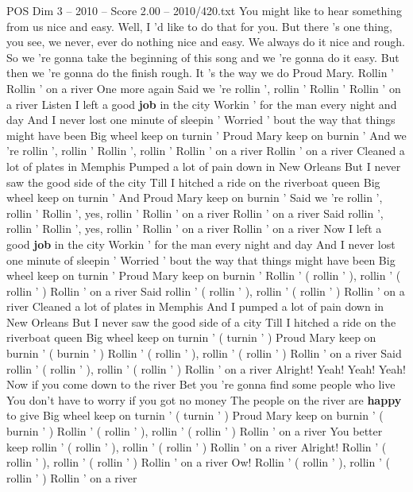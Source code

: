 \begin{textsample}{POS Dim 3 – 2010 – Score 2.00 – 2010/420.txt}  \label{ex:f3_pos_028}
You might like to hear something from us nice and easy.
Well, I 'd like to do that for you.
But there 's one thing, you see, we never, ever do nothing nice and easy.
We always do it nice and rough.
So we 're gonna take the beginning of this song and we 're gonna do it easy.
But then we 're gonna do the finish rough.
It 's the way we do Proud Mary.
Rollin ' Rollin ' on a river One more again Said we 're rollin ', rollin ' Rollin ' Rollin ' on a river Listen I left a good \textbf{job} in the city Workin ' for the man every night and day And I never lost one minute of sleepin ' Worried ' bout the way that things might have been Big wheel keep on turnin ' Proud Mary keep on burnin ' And we 're rollin ', rollin ' Rollin ', rollin ' Rollin ' on a river Rollin ' on a river Cleaned a lot of plates in Memphis Pumped a lot of pain down in New Orleans But I never saw the good side of the city Till I hitched a ride on the riverboat queen Big wheel keep on turnin ' And Proud Mary keep on burnin ' Said we 're rollin ', rollin ' Rollin ', yes, rollin ' Rollin ' on a river Rollin ' on a river Said rollin ', rollin ' Rollin ', yes, rollin ' Rollin ' on a river Rollin ' on a river Now I left a good \textbf{job} in the city Workin ' for the man every night and day And I never lost one minute of sleepin ' Worried ' bout the way that things might have been Big wheel keep on turnin ' Proud Mary keep on burnin ' Rollin ' ( rollin ' ), rollin ' ( rollin ' ) Rollin ' on a river Said rollin ' ( rollin ' ), rollin ' ( rollin ' ) Rollin ' on a river Cleaned a lot of plates in Memphis And I pumped a lot of pain down in New Orleans But I never saw the good side of a city Till I hitched a ride on the riverboat queen Big wheel keep on turnin ' ( turnin ' ) Proud Mary keep on burnin ' ( burnin ' ) Rollin ' ( rollin ' ), rollin ' ( rollin ' ) Rollin ' on a river Said rollin ' ( rollin ' ), rollin ' ( rollin ' ) Rollin ' on a river Alright!
Yeah!
Yeah!
Yeah!
Now if you come down to the river Bet you 're gonna find some people who live You don't have to worry if you got no money The people on the river are \textbf{happy} to give Big wheel keep on turnin ' ( turnin ' ) Proud Mary keep on burnin ' ( burnin ' ) Rollin ' ( rollin ' ), rollin ' ( rollin ' ) Rollin ' on a river You better keep rollin ' ( rollin ' ), rollin ' ( rollin ' ) Rollin ' on a river Alright!
Rollin ' ( rollin ' ), rollin ' ( rollin ' ) Rollin ' on a river Ow!
Rollin ' ( rollin ' ), rollin ' ( rollin ' ) Rollin ' on a river

\end{textsample}
